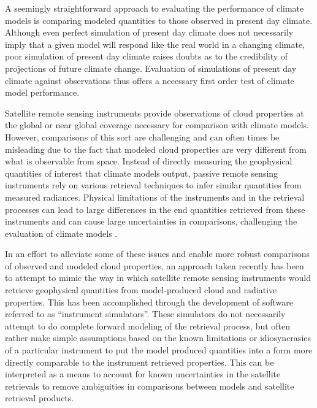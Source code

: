 A seemingly straightforward approach to evaluating the performance of climate models is comparing modeled quantities to those observed in present day climate. Although even perfect simulation of present day climate does not necessarily imply that a given model will respond like the real world in a changing climate, poor simulation of present day climate raises doubts as to the credibility of projections of future climate change. Evaluation of simulations of present day climate against observations thus offers a necessary first order test of climate model performance.

Satellite remote sensing instruments provide observations of cloud properties at the global or near global coverage necessary for comparison with climate models. However, comparisons of this sort are challenging and can often times be misleading due to the fact that modeled cloud properties are very different from what is observable from space. Instead of directly measuring the geophysical quantities of interest that climate models output, passive remote sensing instruments rely on various retrieval techniques to infer similar quantities from measured radiances. Physical limitations of the instruments and in the retrieval processes can lead to large differences in the end quantities retrieved from these instruments and can cause large uncertainties in comparisons, challenging the evaluation of climate models \citep{marchand_et_al_2010,pincus_et_al_2011}. 

In an effort to alleviate some of these issues and enable more robust comparisons of observed and modeled cloud properties, an approach taken recently has been to attempt to mimic the way in which satellite remote sensing instruments would retrieve geophysical quantities from model-produced cloud and radiative properties. This has been accomplished through the development of software referred to as ``instrument simulators''. These simulators do not necessarily attempt to do complete forward modeling of the retrieval process, but often rather make simple assumptions based on the known limitations or idiosyncrasies of a particular instrument to put the model produced quantities into a form more directly comparable to the instrument retrieved properties. This can be interpreted as a means to account for known uncertainties in the satellite retrievals to remove ambiguities in comparisons between models and satellite retrieval products.

